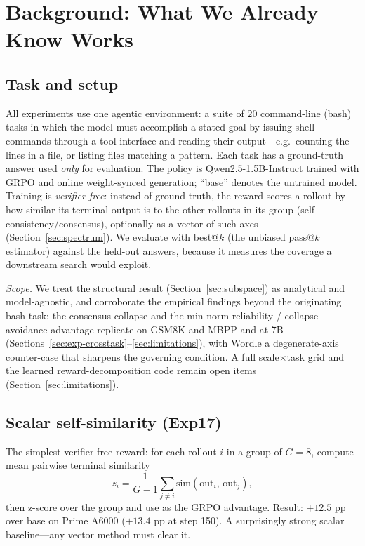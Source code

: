 \documentclass[11pt,a4paper]{article}
\begin{document}
\section{Background: What We Already Know Works}
\label{sec:background}

\subsection{Task and setup}
\label{sec:task}
All experiments use one agentic environment: a suite of $20$ command-line (bash)
tasks in which the model must accomplish a stated goal by issuing shell commands
through a tool interface and reading their output---e.g.\ counting the lines in a
file, or listing files matching a pattern.  Each task has a ground-truth answer
used \emph{only} for evaluation.  The policy is Qwen2.5-1.5B-Instruct trained
with GRPO and online weight-synced generation; ``base'' denotes the untrained
model.  Training is \emph{verifier-free}: instead of ground truth, the reward
scores a rollout by how similar its terminal output is to the other rollouts in
its group (self-consistency/consensus), optionally as a vector of such axes
(Section~\ref{sec:spectrum}).  We evaluate with best@$k$ (the unbiased pass@$k$
estimator) against the held-out answers, because it measures the coverage a
downstream search would exploit.

\emph{Scope.}  We treat the structural result (Section~\ref{sec:subspace}) as
analytical and model-agnostic, and corroborate the empirical findings beyond the
originating bash task: the consensus collapse and the min-norm reliability /
collapse-avoidance advantage replicate on GSM8K and MBPP and at 7B
(Sections~\ref{sec:exp-crosstask}--\ref{sec:limitations}), with Wordle a
degenerate-axis counter-case that sharpens the governing condition.  A full
scale$\times$task grid and the learned reward-decomposition code remain open
items (Section~\ref{sec:limitations}).

\subsection{Scalar self-similarity (Exp17)}

The simplest verifier-free reward: for each rollout $i$ in a group of
$G{=}8$, compute mean pairwise terminal similarity
\[
  z_i = \frac{1}{G{-}1}\sum_{j \neq i} \mathrm{sim}(\mathrm{out}_i,\,
        \mathrm{out}_j),
\]
then z-score over the group and use as the GRPO advantage.
Result: $+12.5$ pp over base on Prime A6000 ($+13.4$ pp at step 150).
A surprisingly strong scalar baseline---any vector method must clear it.
\end{document}
